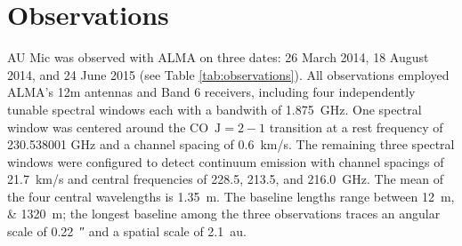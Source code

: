 \documentclass[modern]{aastex62}
\begin{document}
\section{Observations}
\label{section: observations}
AU Mic was observed  with ALMA on three dates: 26 March 2014, 18 August 2014, and 24 June 2015 (see Table \ref{tab:observations}).
All observations employed ALMA's 12m antennas and Band 6 receivers, including four independently tunable spectral windows each with a bandwith of \SI{1.875}{GHz}. 
One spectral window was centered around the CO~$\mathrm{J}=2-1$ transition at a rest frequency of 230.538001 GHz and a channel spacing of \SI{0.6}{km/s}.
The remaining three spectral windows were configured to detect continuum emission with channel spacings of \SI{21.7}{km/s} and central frequencies of 228.5, 213.5, and \SI{216.0}{GHz}.
The mean of the four central wavelengths is \SI{1.35}{m}.
The baseline lengths range between \SIlist{12;1320}{m}; the longest baseline among the three observations traces an angular scale of \SI{0.22}{\arcsecond} and a spatial scale of \SI{2.1}{au}.
\end{document}
